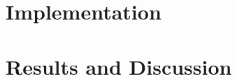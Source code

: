 \documentclass[draft,final]{vutinfth} %
\begin{document}


    \chapter{Implementation}


    \chapter{Results and Discussion}

    \backmatter
    \listoffigures %

    \cleardoublepage %
    \listoftables %

    \listofalgorithms

    \printindex

    \printglossaries

    
    
\end{document}
